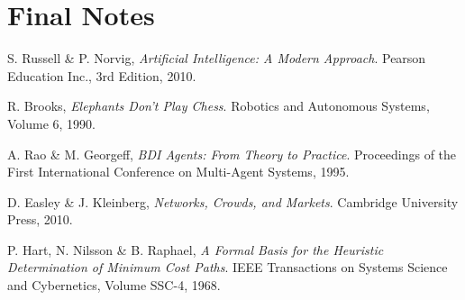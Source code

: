 \documentclass[a4paper,10pt]{article}
\begin{document}
\section{Final Notes}

\begin{thebibliography}{9}
    S. Russell \& P. Norvig,
    \emph{Artificial Intelligence: A Modern Approach}. \newline
    Pearson Education Inc.,
    3rd Edition,
    2010.

    R. Brooks,
    \emph{Elephants Don't Play Chess}. \newline
    Robotics and Autonomous Systems,
    Volume 6,
    1990.

    A. Rao \& M. Georgeff,
    \emph{BDI Agents: From Theory to Practice}. \newline
    Proceedings of the First International Conference on Multi-Agent Systems,
    1995.

    D. Easley \& J. Kleinberg,
    \emph{Networks, Crowds, and Markets}. \newline
    Cambridge University Press,
    2010.

    P. Hart, N. Nilsson \& B. Raphael,
    \emph{A Formal Basis for the Heuristic Determination of Minimum Cost Paths}. \newline
    IEEE Transactions on Systems Science and Cybernetics,
    Volume SSC-4,
    1968.
\end{thebibliography}
\end{document}
